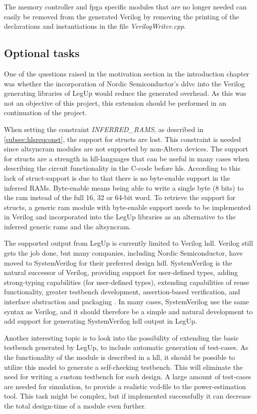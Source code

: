 The memory controller and \gls{fpga} specific modules that are no longer needed can easily be removed from the generated Verilog by removing the printing of the declarations and instantiations in the file \textit{VerilogWriter.cpp}.

\subsection{Optional tasks}

One of the questions raised in the motivation section in the introduction chapter was whether the incorporation of Nordic Semiconductor's \gls{ddvc} into the Verilog generating libraries of LegUp would reduce the generated overhead. As this was not an objective of this project, this extension should be performed in an continuation of the project.

When setting the constraint \textit{INFERRED\_RAMS}, as described in \cref{subsec:hlsreqconst}, the support for structs are lost. This constraint is needed since altsyncram modules are not supported by non-Altera devices. The support for structs are a strength in \gls{hll}-languages that can be useful in many cases when describing the circuit functionality in the C-code before \gls{hls}. According to \cite{legupconst} this lack of struct-support is due to that there is no byte-enable support in the inferred RAMs. Byte-enable means being able to write a single byte (8 bits) to the \gls{ram} instead of the full 16, 32 or 64-bit word. To retrieve the support for structs, a generic \gls{ram} module with byte-enable support needs to be implemented in Verilog and incorporated into the LegUp libraries as an alternative to the inferred generic \gls{ram}s and the altsyncram. 

The supported output from LegUp is currently limited to Verilog \gls{hdl}. Verilog still gets the job done, but many companies, including Nordic Semiconductor, have moved to SystemVerilog for their preferred design \gls{hdl}. SystemVerilog is the natural successor of Verilog, providing support for user-defined types, adding strong-typing capabilities (for user-defined types), extending capabilities of reuse functionality, greater testbench development, assertion-based verification, and interface abstraction and packaging \cite{bailey2003comparison}. In many cases, SystemVerilog use the same syntax as Verilog, and it should therefore be a simple and natural development to add support for generating SystemVerilog \gls{hdl} output in LegUp.

Another interesting topic is to look into the possibility of extending the basic testbench generated by LegUp, to include automatic generation of test-cases. As the functionality of the module is described in a \gls{hll}, it should be possible to utilize this model to generate a self-checking testbench. This will eliminate the need for writing a custom testbench for each design. A large amount of test-cases are needed for simulation, to provide a realistic \gls{vcd}-file to the power-estimation tool. This task might be complex, but if implemented successfully it can decrease the total design-time of a module even further.